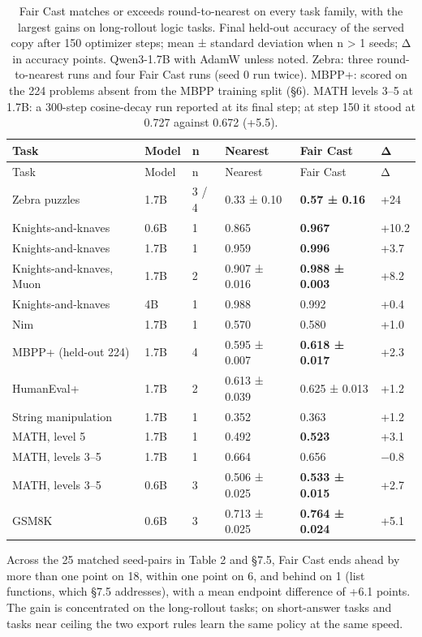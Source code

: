 \documentclass[
  10pt,
]{article}
\begin{document}
\begin{longtable}[]{@{}llllll@{}}
\caption{Fair Cast matches or exceeds round-to-nearest on every task family, with the largest gains
on long-rollout logic tasks. Final held-out accuracy of the served copy after 150 optimizer steps;
mean ± standard deviation when n \textgreater{} 1 seeds; Δ in accuracy points. Qwen3-1.7B with AdamW
unless noted. Zebra: three round-to-nearest runs and four Fair Cast runs (seed 0 run twice). MBPP+:
scored on the 224 problems absent from the MBPP training split (§6). MATH levels 3--5 at 1.7B: a
300-step cosine-decay run reported at its final step; at step 150 it stood at 0.727 against 0.672
(+5.5).}\tabularnewline
\toprule\noalign{}
Task & Model & n & Nearest & Fair Cast & Δ \\
\midrule\noalign{}
\endfirsthead
\toprule\noalign{}
Task & Model & n & Nearest & Fair Cast & Δ \\
\midrule\noalign{}
\endhead
\bottomrule\noalign{}
\endlastfoot
Zebra puzzles & 1.7B & 3 / 4 & 0.33 ± 0.10 & \textbf{0.57 ± 0.16} & +24 \\
Knights-and-knaves & 0.6B & 1 & 0.865 & \textbf{0.967} & +10.2 \\
Knights-and-knaves & 1.7B & 1 & 0.959 & \textbf{0.996} & +3.7 \\
Knights-and-knaves, Muon & 1.7B & 2 & 0.907 ± 0.016 & \textbf{0.988 ± 0.003} & +8.2 \\
Knights-and-knaves & 4B & 1 & 0.988 & 0.992 & +0.4 \\
Nim & 1.7B & 1 & 0.570 & 0.580 & +1.0 \\
MBPP+ (held-out 224) & 1.7B & 4 & 0.595 ± 0.007 & \textbf{0.618 ± 0.017} & +2.3 \\
HumanEval+ & 1.7B & 2 & 0.613 ± 0.039 & 0.625 ± 0.013 & +1.2 \\
String manipulation & 1.7B & 1 & 0.352 & 0.363 & +1.2 \\
MATH, level 5 & 1.7B & 1 & 0.492 & \textbf{0.523} & +3.1 \\
MATH, levels 3--5 & 1.7B & 1 & 0.664 & 0.656 & −0.8 \\
MATH, levels 3--5 & 0.6B & 3 & 0.506 ± 0.025 & \textbf{0.533 ± 0.015} & +2.7 \\
GSM8K & 0.6B & 3 & 0.713 ± 0.025 & \textbf{0.764 ± 0.024} & +5.1 \\
\end{longtable}

Across the 25 matched seed-pairs in Table 2 and §7.5, Fair Cast ends ahead by more than one point on
18, within one point on 6, and behind on 1 (list functions, which §7.5 addresses), with a mean
endpoint difference of +6.1 points. The gain is concentrated on the long-rollout tasks; on
short-answer tasks and tasks near ceiling the two export rules learn the same policy at the same
speed.
\end{document}

